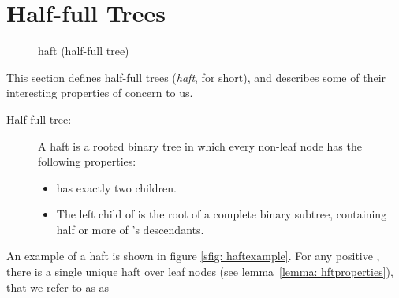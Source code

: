 \documentclass[11pt, letter]{article}
\begin{document}
\section{Half-full Trees}
\label{sec: hafts}

\begin{figure}[h!]
\centering
{}
\hspace{0.4in}
\caption{haft (half-full tree)}
\end{figure}


 This section defines half-full trees (\emph{haft}, for short), and describes some of their interesting properties of concern to us.






\begin{description}
\item[Half-full tree:] A haft is a rooted binary tree in which every non-leaf node 
has the following properties:
\begin{itemize}
 \item  has exactly two children.
 \item The left child of  is the root of a complete binary subtree, containing  half or more of 's  descendants.
\end{itemize}
\end{description}

 An example of a haft is shown in figure \ref{sfig: haftexample}. For any positive , there is a single unique haft over  leaf nodes (see lemma~\ref{lemma: hftproperties}), that we refer to as as 
\end{document}
